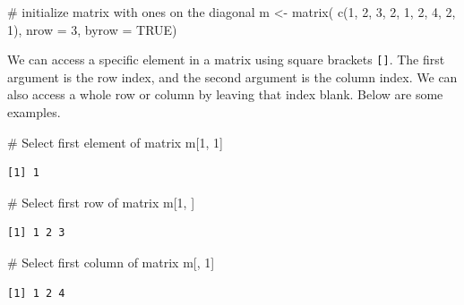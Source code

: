 \documentclass[
  letterpaper,
  DIV=11,
  numbers=noendperiod]{scrreprt}
\newenvironment{Shaded}{\begin{snugshade}}{\end{snugshade}}
\newcommand{\AttributeTok}[1]{\textcolor[rgb]{0.40,0.45,0.13}{#1}}
\newcommand{\CommentTok}[1]{\textcolor[rgb]{0.37,0.37,0.37}{#1}}
\newcommand{\ConstantTok}[1]{\textcolor[rgb]{0.56,0.35,0.01}{#1}}
\newcommand{\DecValTok}[1]{\textcolor[rgb]{0.68,0.00,0.00}{#1}}
\newcommand{\FunctionTok}[1]{\textcolor[rgb]{0.28,0.35,0.67}{#1}}
\newcommand{\NormalTok}[1]{\textcolor[rgb]{0.00,0.23,0.31}{#1}}
\newcommand{\OtherTok}[1]{\textcolor[rgb]{0.00,0.23,0.31}{#1}}
\begin{document}
\begin{Shaded}
\begin{Highlighting}[]
\CommentTok{\# initialize matrix with ones on the diagonal}
\NormalTok{m }\OtherTok{\textless{}{-}} \FunctionTok{matrix}\NormalTok{(}
  \FunctionTok{c}\NormalTok{(}\DecValTok{1}\NormalTok{, }\DecValTok{2}\NormalTok{, }\DecValTok{3}\NormalTok{,}
    \DecValTok{2}\NormalTok{, }\DecValTok{1}\NormalTok{, }\DecValTok{2}\NormalTok{,}
    \DecValTok{4}\NormalTok{, }\DecValTok{2}\NormalTok{, }\DecValTok{1}\NormalTok{),}
  \AttributeTok{nrow =} \DecValTok{3}\NormalTok{,}
  \AttributeTok{byrow =} \ConstantTok{TRUE}\NormalTok{)}
\end{Highlighting}
\end{Shaded}

We can access a specific element in a matrix using square brackets
\texttt{{[}{]}}. The first argument is the row index, and the second
argument is the column index. We can also access a whole row or column
by leaving that index blank. Below are some examples.

\begin{Shaded}
\begin{Highlighting}[]
\CommentTok{\# Select first element of matrix}
\NormalTok{m[}\DecValTok{1}\NormalTok{, }\DecValTok{1}\NormalTok{]}
\end{Highlighting}
\end{Shaded}

\begin{verbatim}
[1] 1
\end{verbatim}

\begin{Shaded}
\begin{Highlighting}[]
\CommentTok{\# Select first row of matrix}
\NormalTok{m[}\DecValTok{1}\NormalTok{, ]}
\end{Highlighting}
\end{Shaded}

\begin{verbatim}
[1] 1 2 3
\end{verbatim}

\begin{Shaded}
\begin{Highlighting}[]
\CommentTok{\# Select first column of matrix}
\NormalTok{m[, }\DecValTok{1}\NormalTok{]}
\end{Highlighting}
\end{Shaded}

\begin{verbatim}
[1] 1 2 4
\end{verbatim}
\end{document}

